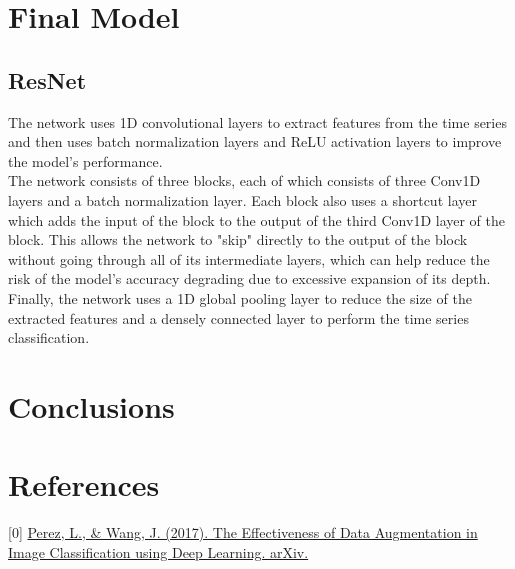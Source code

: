 \documentclass[11pt, oneside]{article}
\begin{document}
\section{Final Model}
\subsection{ResNet}
The network uses 1D convolutional layers to extract features from the time series and then uses batch normalization layers and ReLU activation layers to improve the model's performance.\\
The network consists of three blocks, each of which consists of three Conv1D layers and a batch normalization layer. Each block also uses a shortcut layer which adds the input of the block to the output of the third Conv1D layer of the block. This allows the network to "skip" directly to the output of the block without going through all of its intermediate layers, which can help reduce the risk of the model's accuracy degrading due to excessive expansion of its depth.\\
Finally, the network uses a 1D global pooling layer to reduce the size of the extracted features and a densely connected layer to perform the time series classification.
\section{Conclusions}

\section*{References}
[0] \href{https://doi.org/10.48550/arXiv.1712.04621}{Perez, L., \& Wang, J. (2017). The Effectiveness of Data Augmentation in Image Classification using Deep Learning. arXiv.}\\
\end{document}
